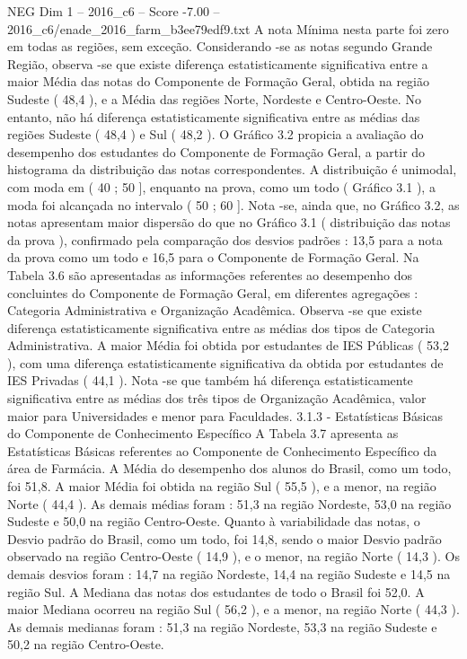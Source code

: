 \begin{textsample}{NEG Dim 1 – 2016\_c6 – Score -7.00 – 2016\_c6/enade\_2016\_farm\_b3ee79edf9.txt}
A nota Mínima nesta parte foi zero em todas as regiões, sem exceção.
Considerando -se as notas segundo Grande Região, observa -se que existe diferença estatisticamente significativa entre a maior Média das notas do Componente de Formação Geral, obtida na região Sudeste ( 48,4 ), e a Média das regiões Norte, Nordeste e Centro-Oeste.
No entanto, não há diferença estatisticamente significativa entre as médias das regiões Sudeste ( 48,4 ) e Sul ( 48,2 ).
O Gráfico 3.2 propicia a avaliação do desempenho dos estudantes do Componente de Formação Geral, a partir do histograma da distribuição das notas correspondentes.
A distribuição é unimodal, com moda em ( 40 ; 50 ], enquanto na prova, como um todo ( Gráfico 3.1 ), a moda foi alcançada no intervalo ( 50 ; 60 ].
Nota -se, ainda que, no Gráfico 3.2, as notas apresentam maior dispersão do que no Gráfico 3.1 ( distribuição das notas da prova ), confirmado pela comparação dos desvios padrões : 13,5 para a nota da prova como um todo e 16,5 para o Componente de Formação Geral.
Na Tabela 3.6 são apresentadas as informações referentes ao desempenho dos concluintes do Componente de Formação Geral, em diferentes agregações : Categoria Administrativa e Organização Acadêmica.
Observa -se que existe diferença estatisticamente significativa entre as médias dos tipos de Categoria Administrativa.
A maior Média foi obtida por estudantes de IES Públicas ( 53,2 ), com uma diferença estatisticamente significativa da obtida por estudantes de IES Privadas ( 44,1 ).
Nota -se que também há diferença estatisticamente significativa entre as médias dos três tipos de Organização Acadêmica, valor maior para Universidades e menor para Faculdades. 3.1.3 - Estatísticas Básicas do Componente de Conhecimento Específico A Tabela 3.7 apresenta as Estatísticas Básicas referentes ao Componente de Conhecimento Específico da área de Farmácia.
A Média do desempenho dos alunos do Brasil, como um todo, foi 51,8.
A maior Média foi obtida na região Sul ( 55,5 ), e a menor, na região Norte ( 44,4 ).
As demais médias foram : 51,3 na região Nordeste, 53,0 na região Sudeste e 50,0 na região Centro-Oeste.
Quanto à variabilidade das notas, o Desvio padrão do Brasil, como um todo, foi 14,8, sendo o maior Desvio padrão observado na região Centro-Oeste ( 14,9 ), e o menor, na região Norte ( 14,3 ).
Os demais desvios foram : 14,7 na região Nordeste, 14,4 na região Sudeste e 14,5 na região Sul.
A Mediana das notas dos estudantes de todo o Brasil foi 52,0.
A maior Mediana ocorreu na região Sul ( 56,2 ), e a menor, na região Norte ( 44,3 ).
As demais medianas foram : 51,3 na região Nordeste, 53,3 na região Sudeste e 50,2 na região Centro-Oeste.

\end{textsample}
